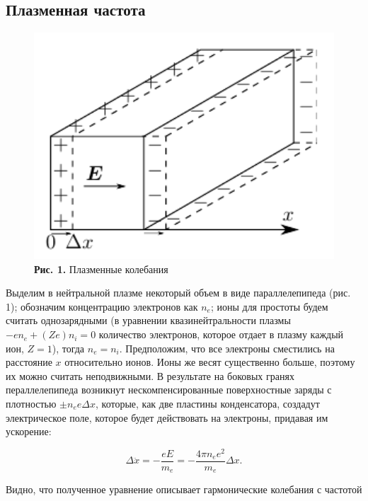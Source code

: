\documentclass[a4paper,12pt]{article} %
\begin{document}
\subsection{Плазменная частота}

\begin{figure}
\begin{center}
    \includegraphics[width=1\textwidth]{3.5.1_1.png}
    \textbf{Рис. 1.} Плазменные колебания
\end{center}
\end{figure}

\hfill \break Выделим в нейтральной плазме некоторый объем в виде параллелепипеда (рис. 1); обозначим концентрацию электронов как $n_{e}$; ионы для простоты будем считать однозарядными (в уравнении квазинейтральности плазмы $-en_{e}+(Ze)n_{i} = 0$ количество электронов, которое отдает в плазму каждый ион, $Z = 1$), тогда $n_{e} = n_{i}$. Предположим, что все электроны сместились на расстояние $x$ относительно ионов. Ионы же весят существенно больше, поэтому их можно считать неподвижными. В результате на боковых гранях пераллелепипеда возникнут нескомпенсированные поверхностные заряды с плотностью $\pm n_{e}e\Delta x$, которые, как две пластины конденсатора, создадут электрическое поле, которое будет действовать на электроны, придавая им ускорение:

$$
\Delta \ddot{x} = -\frac{eE}{m_{e}} = -\frac{4\pi n_{e}e^2}{m_{e}} \Delta x.
$$

\hfill \break Видно, что полученное уравнение описывает гармонические колебания с частотой
\end{document}
